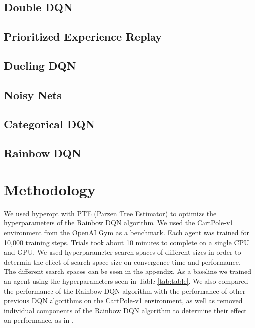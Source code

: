 \documentclass{article}
\begin{document}
\subsection{Double DQN}
\lipsum[6]

\subsection{Prioritized Experience Replay}
\lipsum[7]

\subsection{Dueling DQN}
\lipsum[8]

\subsection{Noisy Nets}
\lipsum[9]

\subsection{Categorical DQN}
\lipsum[10]

\subsection{Rainbow DQN}
\lipsum[11]

\section{Methodology}
We used hyperopt with PTE (Parzen Tree Estimator) to optimize the hyperparameters of the Rainbow DQN algorithm. We used the CartPole-v1 environment from the OpenAI Gym as a benchmark. Each agent was trained for 10,000 training steps. Trials took about 10 minutes to complete on a single CPU and GPU. We used hyperparameter search spaces of different sizes in order to determin the effect of search space size on convergence time and performance. The different search spaces can be seen in the appendix. As a baseline we trained an agent using the hyperparameters seen in Table \ref{tab:table}. We also compared the performance of the Rainbow DQN algorithm with the performance of other previous DQN algorithms on the CartPole-v1 environment, as well as removed individual components of the Rainbow DQN algorithm to determine their effect on performance, as in \citep{DBLP:journals/corr/abs-1710-02298}.
\end{document}
